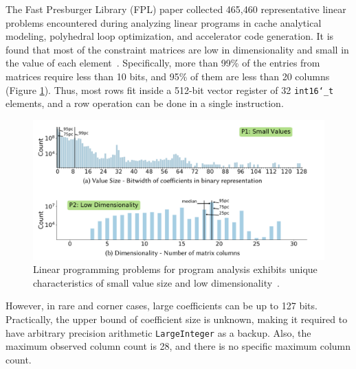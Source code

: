 \documentclass[logo,bsc,singlespacing,parskip]{infthesis}
\newcommand{\dtshort}{\texttt{int16\char`_t}}
\begin{document}
The Fast Presburger Library (FPL) paper collected 465,460 representative linear
problems encountered during analyzing linear programs in cache analytical
modeling, polyhedral loop optimization, and accelerator code generation. It is
found that most of the constraint matrices are low in dimensionality and small
in the value of each element~\cite{FPL1}. Specifically, more than 99\% of the
entries from matrices require less than 10 bits, and 95\% of them are less than 20 columns
(Figure \ref{small-val-low-dim}). Thus, most rows fit inside a 512-bit
vector register of 32 \dtshort{} elements, and a row operation can be done in a
single instruction. 


\begin{figure}
    \begin{center}
    \includegraphics[width=\linewidth]{image/small-val-low-dim.png}
    \caption{Linear programming problems for program analysis exhibits unique
    characteristics of small value size and low dimensionality~\cite{FPL1}.}
    \label{small-val-low-dim}
    \end{center}
\end{figure}


However, in rare and corner cases, large coefficients can be up to 127 bits.
Practically, the upper bound of coefficient size is unknown, making it required
to have arbitrary precision arithmetic \texttt{LargeInteger} as a backup. Also,
the maximum observed column count is 28, and there is no specific maximum column
count. 
\end{document}

